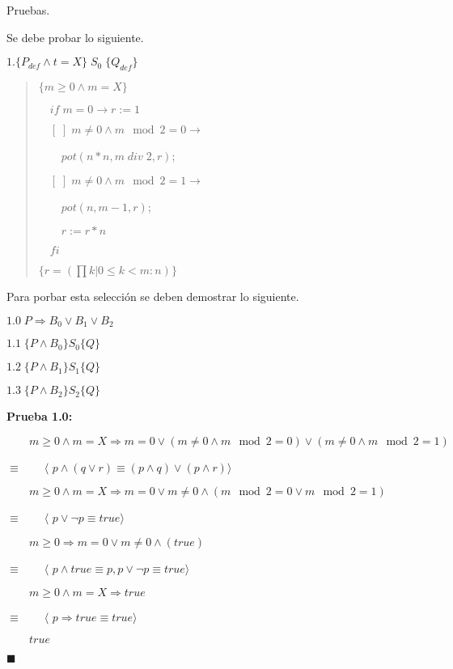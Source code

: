 \documentclass[hidelinks]{article}
\newenvironment{absolutelynopagebreak}
{\Needspace{10\baselineskip}\begin{quote}}
		{\end{quote}}
\begin{document}
Pruebas.\par

Se debe probar lo siguiente.\par

$1.\{P_{def} \land t = X\} \; S_0 \; \{Q_{def}\}$\par

\begin{absolutelynopagebreak}
	$\{m \geq 0 \land m = X\}$\par
	$\quad if \; m = 0 \rightarrow r := 1$\par
	$\quad [\;] \; m \neq 0 \land m \mod 2 = 0 \rightarrow $\par
	$\qquad pot(n * n, m \; div \; 2, r)$;\par
	$\quad [\;] \; m \neq 0 \land m \mod 2 = 1 \rightarrow $\par
	$\qquad pot(n, m - 1, r)$;\par
	$\qquad r := r * n$\par
	$\quad fi$\par
	$\{r = (\prod k | 0 \leq k < m: n)\}$\par
\end{absolutelynopagebreak}\par

Para porbar esta selección se deben demostrar lo siguiente.\par

$1.0 \; P \Rightarrow B_0 \lor B_1 \lor B_2$\par
$1.1 \; \{P \land B_0\}S_0\{Q\}$\par
$1.2 \; \{P \land B_1\}S_1\{Q\}$\par
$1.3 \; \{P \land B_2\}S_2\{Q\}$\par

\textbf{Prueba 1.0:}\par

$\qquad m \geq 0 \land m = X \Rightarrow m = 0 \lor (m \neq 0 \land m \mod 2 = 0) \lor (m \neq 0 \land m \mod 2 = 1)$\par
$\equiv \qquad \langle$ $p \land (q \lor r) \equiv (p \land q) \lor (p \land r)\rangle$\par
$\qquad m \geq 0 \land m = X \Rightarrow m = 0 \lor m \neq 0 \land(m \mod 2 = 0 \lor  m \mod 2 = 1)$\par
$\equiv \qquad \langle$ $p \lor \neg p \equiv true\rangle$\par
$\qquad m \geq 0 \Rightarrow m = 0 \lor m \neq 0 \land(true)$\par
$\equiv \qquad \langle$ $p \land true \equiv p, p \lor \neg p \equiv true\rangle$\par
$\qquad m \geq 0 \land m = X \Rightarrow true$\par
$\equiv \qquad \langle$ $p \Rightarrow true \equiv true\rangle$\par
$\qquad true$\par
$\blacksquare$\par
\end{document}
